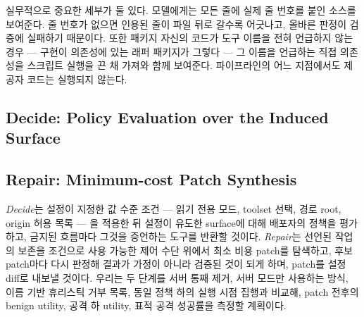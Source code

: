 \documentclass[acmsmall,screen,review,anonymous]{acmart}
\begin{document}
실무적으로 중요한 세부가 둘 있다. 모델에게는 모든 줄에 실제 줄 번호를 붙인 소스를 보여준다. 줄 번호가 없으면 인용된 줄이 파일 뒤로 갈수록 어긋나고, 올바른 판정이 검증에 실패하기 때문이다. 또한 패키지 자신의 코드가 도구 이름을 전혀 언급하지 않는 경우 --- 구현이 의존성에 있는 래퍼 패키지가 그렇다 --- 그 이름을 언급하는 직접 의존성을 스크립트 실행을 끈 채 가져와 함께 보여준다. 파이프라인의 어느 지점에서도 제공자 코드는 실행되지 않는다.

\subsection{Decide: Policy Evaluation over the Induced Surface}


\subsection{Repair: Minimum-cost Patch Synthesis}

\emph{Decide}는 설정이 지정한 값 수준 조건 --- 읽기 전용 모드, toolset 선택, 경로 root, origin 허용 목록 --- 을 적용한 뒤 설정이 유도한 surface에 대해 배포자의 정책을 평가하고, 금지된 흐름마다 그것을 증언하는 도구를 반환할 것이다. \emph{Repair}는 선언된 작업의 보존을 조건으로 사용 가능한 제어 수단 위에서 최소 비용 patch를 탐색하고, 후보 patch마다 다시 판정해 결과가 가정이 아니라 검증된 것이 되게 하며, patch를 설정 diff로 내보낼 것이다. 우리는 두 단계를 서버 통째 제거, 서버 모드만 사용하는 방식, 이름 기반 휴리스틱 거부 목록, 동일 정책 하의 실행 시점 집행과 비교해, patch 전후의 benign utility, 공격 하 utility, 표적 공격 성공률을 측정할 계획이다.
\end{document}
